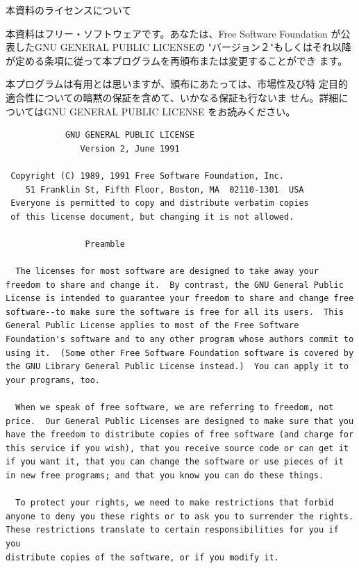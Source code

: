 \documentclass[mingoth,a4paper]{jsarticle}
\begin{document}
\begin{center}
本資料のライセンスについて
\end{center}

本資料はフリー・ソフトウェアです。あなたは、Free Software
Foundation が公表したGNU GENERAL PUBLIC LICENSEの "バージョン２"もしくはそれ以降
が定める条項に従って本プログラムを再頒布または変更することができ
ます。

本プログラムは有用とは思いますが、頒布にあたっては、市場性及び特
定目的適合性についての暗黙の保証を含めて、いかなる保証も行ないま
せん。詳細についてはGNU GENERAL PUBLIC LICENSE をお読みください。

\begin{multicols}{2}
 \begin{fontsize}{6}{6}
 \begin{verbatim}
            GNU GENERAL PUBLIC LICENSE
               Version 2, June 1991

 Copyright (C) 1989, 1991 Free Software Foundation, Inc.
    51 Franklin St, Fifth Floor, Boston, MA  02110-1301  USA
 Everyone is permitted to copy and distribute verbatim copies
 of this license document, but changing it is not allowed.

                Preamble

  The licenses for most software are designed to take away your
freedom to share and change it.  By contrast, the GNU General Public
License is intended to guarantee your freedom to share and change free
software--to make sure the software is free for all its users.  This
General Public License applies to most of the Free Software
Foundation's software and to any other program whose authors commit to
using it.  (Some other Free Software Foundation software is covered by
the GNU Library General Public License instead.)  You can apply it to
your programs, too.

  When we speak of free software, we are referring to freedom, not
price.  Our General Public Licenses are designed to make sure that you
have the freedom to distribute copies of free software (and charge for
this service if you wish), that you receive source code or can get it
if you want it, that you can change the software or use pieces of it
in new free programs; and that you know you can do these things.

  To protect your rights, we need to make restrictions that forbid
anyone to deny you these rights or to ask you to surrender the rights.
These restrictions translate to certain responsibilities for you if you
distribute copies of the software, or if you modify it.


\end{verbatim}
\end{fontsize}
\end{multicols}
\end{document}

